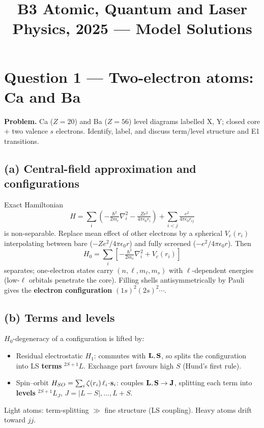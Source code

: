 \documentclass[11pt]{article}
\title{B3 Atomic, Quantum and Laser Physics, 2025 --- Model Solutions}
\author{}
\date{}
\newcommand{\Lap}{\nabla^{2}}
\begin{document}
\maketitle

\section*{Question 1 --- Two-electron atoms: Ca and Ba}

\textbf{Problem.} Ca ($Z=20$) and Ba ($Z=56$) level diagrams labelled X, Y; closed core $+$ two valence $s$ electrons. Identify, label, and discuss term/level structure and E1 transitions.

\subsection*{(a) Central-field approximation and configurations}

Exact Hamiltonian
\[
H = \sum_{i}\!\left(-\tfrac{\hbar^{2}}{2m_e}\Lap_i - \tfrac{Ze^{2}}{4\pi\epsilon_0 r_i}\right) + \sum_{i<j}\tfrac{e^{2}}{4\pi\epsilon_0 r_{ij}}
\]
is non-separable. Replace mean effect of other electrons by a spherical $V_c(r_i)$ interpolating between bare ($-Ze^2/4\pi\epsilon_0 r$) and fully screened ($-e^2/4\pi\epsilon_0 r$). Then
\begin{equation}
H_0 = \sum_i \left[-\tfrac{\hbar^{2}}{2m_e}\Lap_i + V_c(r_i)\right]
\label{eq:Hcf}
\end{equation}
separates; one-electron states carry $(n,\ell,m_\ell,m_s)$ with $\ell$-dependent energies (low-$\ell$ orbitals penetrate the core). Filling shells antisymmetrically by Pauli gives the \textbf{electron configuration} $(1s)^2(2s)^2\cdots$.

\subsection*{(b) Terms and levels}

$H_0$-degeneracy of a configuration is lifted by:
\begin{itemize}
\item Residual electrostatic $H_1$: commutes with $\vb L,\vb S$, so splits the configuration into LS \textbf{terms} $^{2S+1}\!L$. Exchange part favours high $S$ (Hund's first rule).
\item Spin--orbit $H_{SO}=\sum_i \zeta(r_i)\,\vb \ell_i\!\cdot\!\vb s_i$: couples $\vb L,\vb S\to\vb J$, splitting each term into \textbf{levels} $^{2S+1}\!L_J$, $J=|L-S|,\ldots,L+S$.
\end{itemize}
Light atoms: term-splitting $\gg$ fine structure (LS coupling). Heavy atoms drift toward $jj$.
\end{document}
